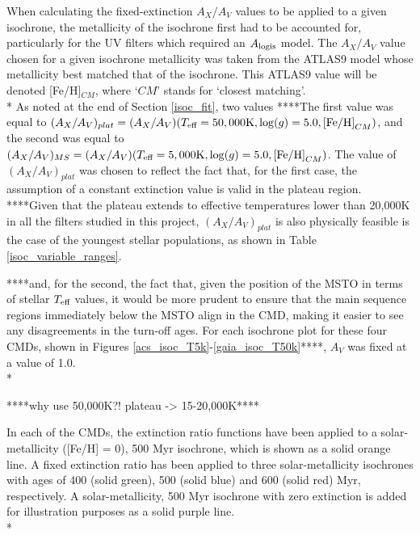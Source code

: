 \documentclass[12pt, a4paper]{report}
\begin{document}
When calculating the fixed-extinction $A_{X}/A_{V}$ values to be applied to a given isochrone, the metallicity of the isochrone first had to be accounted for, particularly for the UV filters which required an $A_{\textnormal{logis}}$ model. The $A_{X}/A_{V}$ value chosen for a given isochrone metallicity was taken from the ATLAS9 model whose metallicity best matched that of the isochrone. This ATLAS9 value will be denoted [Fe/H]$_{CM}$, where `$CM$' stands for `closest matching'.\\*
As noted at the end of Section \ref{isoc_fit}, two values ****The first value was equal to $(A_{X}/A_{V})_{plat} = (A_{X}/A_{V})(T_{\textnormal{eff}} = 50,000\textnormal{K},\log(g) = 5.0,\textnormal{[Fe/H]}_{CM})$, and the second was equal to $(A_{X}/A_{V})_{MS} = (A_{X}/A_{V})(T_{\textnormal{eff}} = 5,000\textnormal{K},\log(g) = 5.0,\textnormal{[Fe/H]}_{CM})$. The value of $(A_{X}/A_{V})_{plat}$ was chosen to reflect the fact that, for the first case, the assumption of a constant extinction value is valid in the plateau region. ****Given that the plateau extends to effective temperatures lower than 20,000K in all the filters studied in this project, $(A_{X}/A_{V})_{plat}$ is also physically feasible is the case of the youngest stellar populations, as shown in Table \ref{isoc_variable_ranges}.


****and, for the second, the fact that, given the position of the MSTO in terms of stellar $T_{\textnormal{eff}}$ values, it would be more prudent to ensure that the main sequence regions immediately below the MSTO align in the CMD, making it easier to see any disagreements in the turn-off ages. For each isochrone plot for these four CMDs, shown in Figures \ref{acs_isoc_T5k}-\ref{gaia_isoc_T50k}****, $A_{V}$ was fixed at a value of 1.0.\\*

****why use 50,000K?! plateau -> 15-20,000K**** 

In each of the CMDs, the extinction ratio functions have been applied to a solar-metallicity ([Fe/H] = 0), 500 Myr isochrone, which is shown as a solid orange line. A fixed extinction ratio has been applied to three solar-metallicity isochrones with ages of 400 (solid green), 500 (solid blue) and 600 (solid red) Myr, respectively. A solar-metallicity, 500 Myr isochrone with zero extinction is added for illustration purposes as a solid purple line.\\*
\end{document}
